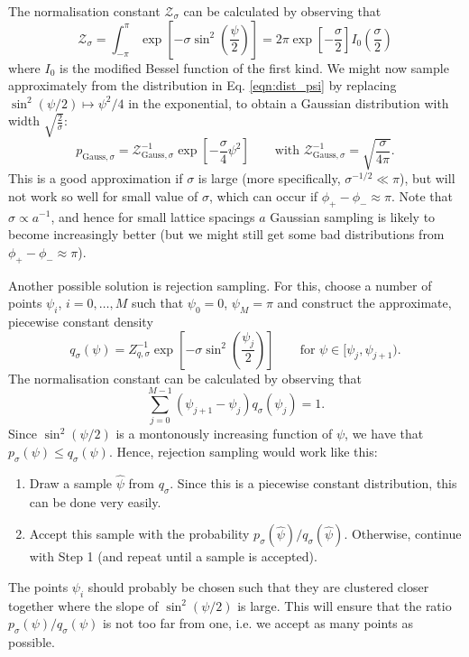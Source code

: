 \documentclass[11pt]{article}
\begin{document}
The normalisation constant $\mathcal{Z}_\sigma$ can be calculated by observing that
\begin{equation*}
  \mathcal{Z}_\sigma = \int_{-\pi}^{\pi} \exp\left[-\sigma\sin^2\left(\frac{\psi}{2}\right)\right] = 2\pi \exp\left[-\frac{\sigma}{2}\right]I_0\left(\frac{\sigma}{2}\right)
\end{equation*}
where $I_0$ is the modified Bessel function of the first kind. We might now sample approximately from the distribution in Eq. \eqref{eqn:dist_psi} by replacing $\sin^2(\psi/2)\mapsto \psi^2/4$ in the exponential, to obtain a Gaussian distribution with width $\sqrt{\frac{2}{\sigma}}$:
\begin{equation*}
  p_{\text{Gauss},\sigma} = \mathcal{Z}_{\text{Gauss},\sigma}^{-1} \exp\left[-\frac{\sigma}{4}\psi^2\right]\qquad\text{with $\mathcal{Z}_{\text{Gauss},\sigma}^{-1}=\sqrt{\frac{\sigma}{4\pi}}$}.
\end{equation*}
This is a good approximation if $\sigma$ is large (more specifically, $\sigma^{-1/2}\ll\pi$), but will not work so well for small value of $\sigma$, which can occur if $\phi_+-\phi_-\approx \pi$. Note that $\sigma\propto a^{-1}$, and hence for small lattice spacings $a$ Gaussian sampling is likely to become increasingly better (but we might still get some bad distributions from $\phi_+-\phi_-\approx\pi$).

Another possible solution is rejection sampling. For this, choose a number of points $\psi_i$, $i=0,\dots,M$ such that $\psi_0=0$, $\psi_M=\pi$ and construct the approximate, piecewise constant density
\begin{equation}
q_\sigma(\psi) = Z_{q,\sigma}^{-1} \exp\left[
-\sigma \sin^2\left(\frac{\psi_j}{2}\right)
\right]\qquad\text{for $\psi\in[\psi_{j},\psi_{j+1})$.}
\end{equation}
The normalisation constant can be calculated by observing that
\begin{equation*}
\sum_{j=0}^{M-1} (\psi_{j+1}-\psi_j) q_\sigma(\psi_j) = 1.
\end{equation*}
Since $\sin^2(\psi/2)$ is a montonously increasing function of $\psi$, we have that $p_\sigma(\psi)\le q_\sigma(\psi)$. Hence, rejection sampling would work like this:
\begin{enumerate}
\item Draw a sample $\hat{\psi}$ from $q_\sigma$. Since this is a piecewise constant distribution, this can be done very easily.
  \item Accept this sample with the probability $p_\sigma(\hat{\psi})/q_\sigma(\hat{\psi})$. Otherwise, continue with Step 1 (and repeat until a sample is accepted).
\end{enumerate}
The points $\psi_i$ should probably be chosen such that they are clustered closer together where the slope of $\sin^2(\psi/2)$ is large. This will ensure that the ratio $p_\sigma(\psi)/q_\sigma(\psi)$ is not too far from one, i.e. we accept as many points as possible.
\end{document}
